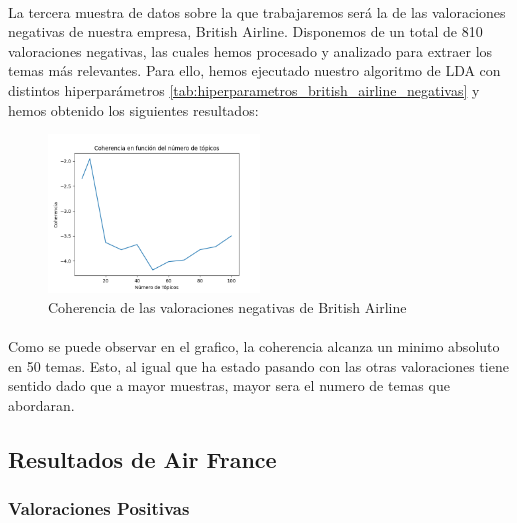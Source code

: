 \documentclass{report}
\begin{document}
{{                    \paragraph*{}{
                        La tercera muestra de datos sobre la que trabajaremos será la de las valoraciones negativas de nuestra empresa, British Airline.
                        Disponemos de un total de 810 valoraciones negativas, las cuales hemos procesado y analizado para extraer los temas más relevantes.
                        Para ello, hemos ejecutado nuestro algoritmo de LDA con distintos hiperparámetros \ref{tab:hiperparametros_british_airline_negativas} y hemos obtenido los siguientes resultados:
                    }
                    \begin{figure}[H]
                        \centering
                        \includegraphics[width=0.5\textwidth]{./img/british_airline_negativas.png}
                        \caption{Coherencia de las valoraciones negativas de British Airline}
                    \end{figure}
                    \paragraph*{}{
                        Como se puede observar en el grafico, la coherencia alcanza un minimo absoluto en 50 temas.
                        Esto, al igual que ha estado pasando con las otras valoraciones tiene sentido dado que a mayor muestras, mayor sera el numero de temas que abordaran.
                    }
            \clearpage\subsection{Resultados de Air France}
                \subsubsection*{Valoraciones Positivas}
}}
\end{document}
